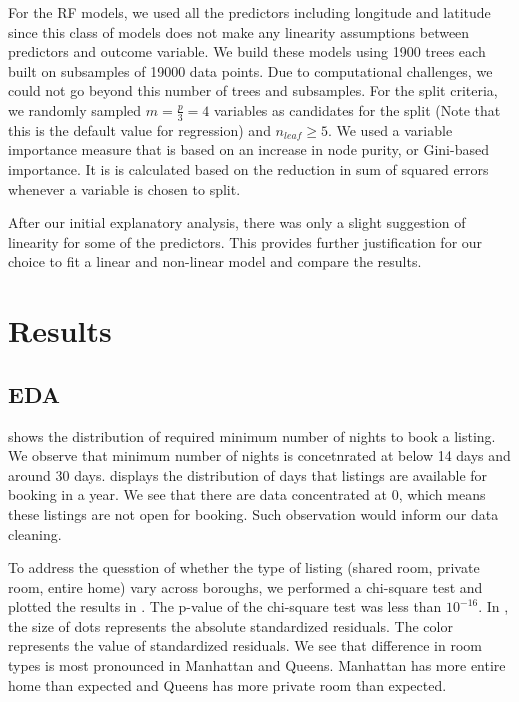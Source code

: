 \documentclass[10pt]{jmlr}%
\begin{document}
For the RF models, we used all the predictors including longitude and latitude since this class of models does not make any linearity assumptions between predictors and outcome variable. We build these models using 1900 trees each built on subsamples of 19000 data points. Due to computational challenges, we could not go beyond this number of trees and subsamples. For the split criteria, we randomly sampled $m = \frac{p}{3} = 4$ variables as candidates for the split (Note that this is the default value for regression) and $n_{leaf} \geq 5$. We used a variable importance measure that is based on an increase in node purity, or Gini-based importance. It is is calculated based on the reduction in sum of squared errors whenever a variable is chosen to split.

After our initial explanatory analysis, there was only a slight suggestion of linearity for some of the predictors. This provides further justification for our choice to fit a linear and non-linear model and compare the results.


\section{Results}
\label{sec:results}

\subsection{EDA}

 shows the distribution of required minimum number of nights to book a listing. We observe that minimum number of nights is concetnrated at below 14 days and around 30 days.  displays the distribution of days that listings are available for booking in a year. We see that there are data concentrated at 0, which means these listings are not open for booking. Such observation would inform our data cleaning.

To address the quesstion of whether the type of listing (shared room, private room, entire home) vary across boroughs, we performed a chi-square test and plotted the results in . The p-value of the chi-square test was less than $10^{-16}$. In , the size of dots represents the absolute standardized residuals. The color represents the value of standardized residuals. We see that difference in room types is most pronounced in Manhattan and Queens. Manhattan has more entire home than expected and Queens has more private room than expected.
\end{document}
